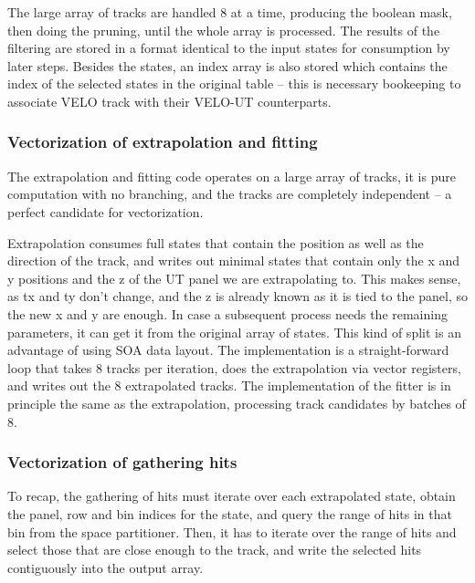 \documentclass[12pt]{article}
\begin{document}
The large array of tracks are handled 8 at a time, producing the boolean mask, then doing the pruning, until the whole array is processed. The results of the filtering are stored in a format identical to the input states for consumption by later steps. Besides the states, an index array is also stored which contains the index of the selected states in the original table -- this is necessary bookeeping to associate VELO track with their VELO-UT counterparts.


\subsubsection{Vectorization of extrapolation and fitting}\label{sec_velout_vectorize_extrap_fit}

The extrapolation and fitting code operates on a large array of tracks, it is pure computation with no branching, and the tracks are completely independent -- a perfect candidate for vectorization.

Extrapolation consumes full states that contain the position as well as the direction of the track, and writes out minimal states that contain only the x and y positions and the z of the UT panel we are extrapolating to. This makes sense, as tx and ty don't change, and the z is already known as it is tied to the panel, so the new x and y are enough. In case a subsequent process needs the remaining parameters, it can get it from the original array of states. This kind of split is an advantage of using SOA data layout. The implementation is a straight-forward loop that takes 8 tracks per iteration, does the extrapolation via vector registers, and writes out the 8 extrapolated tracks. The implementation of the fitter is in principle the same as the extrapolation, processing track candidates by batches of 8.


\subsubsection{Vectorization of gathering hits}\label{sec_velout_vectorize_gathering_hits}

To recap, the gathering of hits must iterate over each extrapolated state, obtain the panel, row and bin indices for the state, and query the range of hits in that bin from the space partitioner. Then, it has to iterate over the range of hits and select those that are close enough to the track, and write the selected hits contiguously into the output array.
\end{document}
